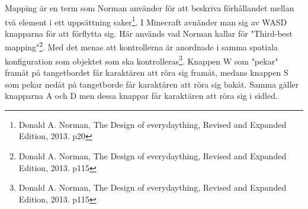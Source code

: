 
Mapping är en term som Norman använder för att beskriva förhållandet mellan två
element i ett uppsättning saker\footnote{Donald A. Norman, The Design of everydaything, Revised and Expanded Edition, 2013. p20}. 
I Minecraft avnänder
man sig av WASD knapparna för att förflytta sig. Här används vad Norman kallar för 
"Third-best mapping"\footnote{Donald A. Norman, The Design of everydaything, Revised and Expanded Edition, 2013. p115}. Med det menas att kontrollerna 
är anordnade i samma spatiala konfiguration som objektet som ska kontrolleras\footnote{Donald A. Norman, The Design of everydaything, Revised and Expanded Edition, 2013. p115}.
Knappen W som "pekar" framåt på tangetbordet får karaktären att röra sig framåt, medans knappen S som pekar nedåt på tangetborde 
får karaktären att röra sig bakåt. Samma gäller knapparna A och D men dessa knappar får karaktären att röra sig i sidled. 
